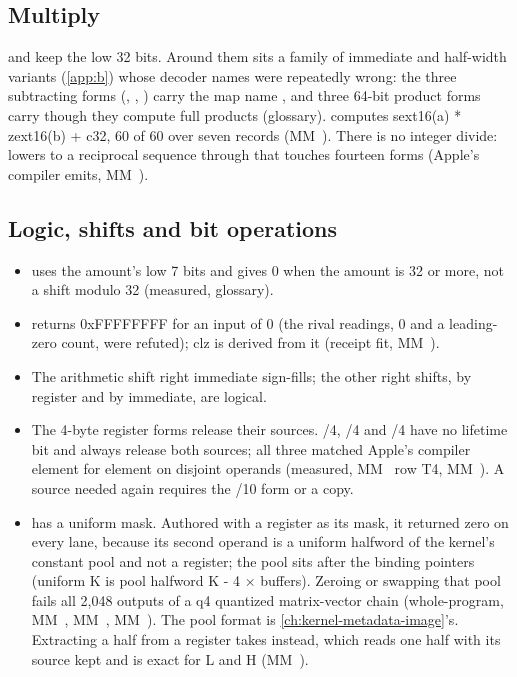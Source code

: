 \subsection*{Multiply}

 and  keep the low 32 bits. Around them sits a
family of immediate and half-width variants (\cref{app:b}) whose decoder names were repeatedly wrong: the three subtracting
forms (, , ) carry the map name , and three 64-bit product forms carry  though they compute full products
(glossary).  computes sext16(a) * zext16(b) + c32, 60 of 60 over seven
records (MM~). There is no integer divide:  lowers to a reciprocal sequence through  that touches fourteen forms (Apple's compiler emits, MM~).

\subsection*{Logic, shifts and bit operations}

\begin{itemize}
\item {} uses the amount's low 7 bits and gives 0 when the amount is 32 or more, not
  a shift modulo 32 (measured, glossary).
\item {} returns 0xFFFFFFFF for an input of 0 (the rival readings, 0 and a leading-zero
  count, were refuted); clz is derived from it (receipt fit, MM~).
\item The arithmetic shift right immediate sign-fills; the other right shifts, by register and by immediate, are logical.
\item The 4-byte register forms release their sources. /4, /4 and /4 have no lifetime bit and always release both sources; all three matched Apple's compiler element for
  element on disjoint operands (measured, MM~ row T4, MM~). A source needed again requires the /10 form or a
  copy.
\item {} has a uniform mask. Authored with a register as its mask, it returned zero on
  every lane, because its second operand is a uniform halfword of the kernel's constant pool and not a
  register; the pool sits after the binding pointers (uniform K is pool halfword K - 4 × buffers). Zeroing or
  swapping that pool fails all 2,048 outputs of a q4 quantized matrix-vector chain (whole-program, MM~,
  MM~, MM~). The pool format is \cref{ch:kernel-metadata-image}'s. Extracting a half from a register takes  instead, which reads one half with its source kept and is exact for L and H (MM~).
\end{itemize}

